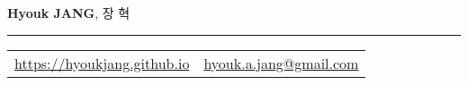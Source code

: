 \documentclass[letterpaper,11pt,oneside]{article}
\begin{document}

\noindent  \LARGE{\textbf{Hyouk JANG}, 장 혁} \\
\vspace{-2ex} 
\hrule 
\normalsize

\begin{center}
\begin{tabular}{l l}
\href{hyoukjang.github.io}{https://hyoukjang.github.io} & \href{mailto:hyouk.a.jang@gmail.com}{hyouk.a.jang@gmail.com} \\
\end{tabular}
\end{center}

\end{document}
